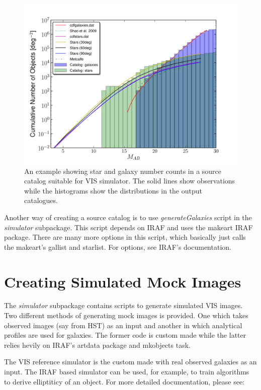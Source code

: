 \documentclass[a4paper,12pt,english]{sphinxmanual}
\begin{document}
\begin{figure}[htbp]
\centering
\capstart

\includegraphics{Distributions.pdf}
\caption{An example showing star and galaxy number counts in a source catalog suitable for VIS simulator.
The solid lines show observations while the histograms show the distributions in the output catalogues.}\end{figure}

Another way of creating a source catalog is to use \emph{generateGalaxies} script in the \emph{simulator} subpackage.
This script depends on IRAF and uses the makeart IRAF package. There are many more options in this script,
which basically just calls the makeart's gallist and starlist. For options, see IRAF's documentation.


\chapter{Creating Simulated Mock Images}
\label{index:creating-simulated-mock-images}
The \emph{simulator} subpackage contains scripts to generate simulated VIS images. Two different methods
of generating mock images is provided. One which takes observed images (say from HST) as an input and
another in which analytical profiles are used for galaxies. The former code is custom made while the
latter relies hevily on IRAF's artdata package and mkobjects task.

The VIS reference simulator is the custom made with real observed galaxies as an input. The IRAF
based simulator can be used, for example, to train algorithms to derive elliptiticy of an object.
For more detailed documentation, please see:
\end{document}

